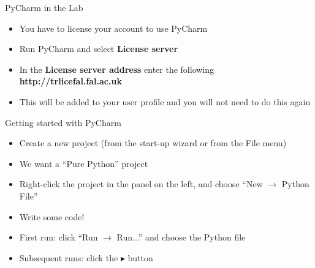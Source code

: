\begin{frame}{PyCharm in the Lab}
	\begin{itemize}
		\pause\item You have to license your account to use PyCharm
		\pause\item Run PyCharm and select \textbf{License server}
		\pause\item In the \textbf{License server address} enter the following \textbf{http://trlicefal.fal.ac.uk}
		\pause\item This will be added to your user profile and you will not need to do this again
	\end{itemize} 
\end{frame}

\begin{frame}{Getting started with PyCharm}
\begin{itemize}
\pause\item Create a new project (from the start-up wizard or from the File menu)
\pause\item We want a ``Pure Python'' project
\pause\item Right-click the project in the panel on the left, and choose ``New $\to$ Python File''
\pause\item Write some code!
\pause\item First run: click ``Run $\to$ Run...'' and choose the Python file
\pause\item Subsequent runs: click the $\blacktriangleright$ button
\end{itemize}
\end{frame}
